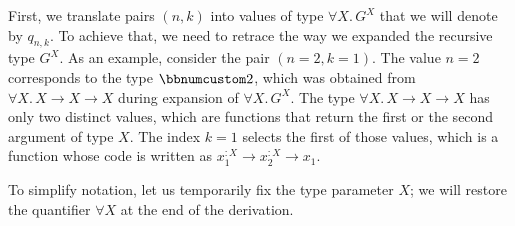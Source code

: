 First, we translate pairs $\left(n,k\right)$ into values of type
$\forall X.\,G^{X}$ that we will denote by $q_{n,k}$. To achieve
that, we need to retrace the way we expanded the recursive type $G^{X}$.
As an example, consider the pair $\left(n=2,k=1\right)$. The value
$n=2$ corresponds to the type $\bbnum 2$, which was obtained from
$\forall X.\,X\rightarrow X\rightarrow X$ during expansion of $\forall X.\,G^{X}$.
The type $\forall X.\,X\rightarrow X\rightarrow X$ has only two distinct
values, which are functions that return the first or the second argument
of type $X$. The index $k=1$ selects the first of those values,
which is a function whose code is written as $x_{1}^{:X}\rightarrow x_{2}^{:X}\rightarrow x_{1}$. 

To simplify notation, let us temporarily fix the type parameter $X$;
we will restore the quantifier $\forall X$ at the end of the derivation.

